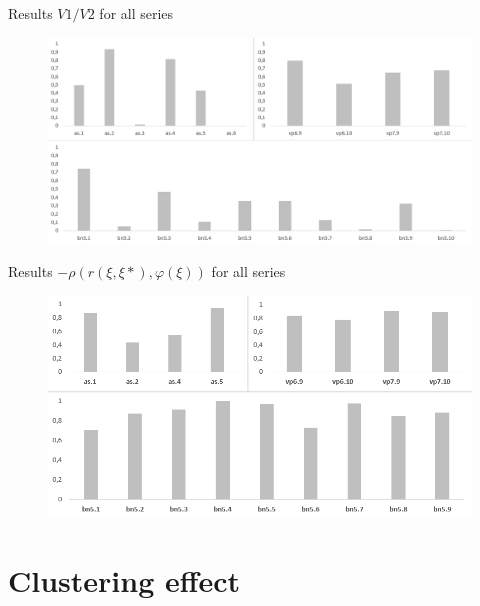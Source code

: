 \documentclass[aspectratio=169,xcolor=dvipsnames]{beamer}
\begin{document}

\begin{frame}{Results $V1/V2$ for all series}
    \begin{figure}
    \includegraphics[scale=0.6]{volume}
    \end{figure}
\end{frame}


\begin{frame}{Results $-\rho(r(\xi, \xi*),\varphi(\xi))$ for all series}
    \begin{figure}
    \includegraphics[scale=0.8]{ro}
    \end{figure}
\end{frame}

\section{Clustering effect}
\end{document}
